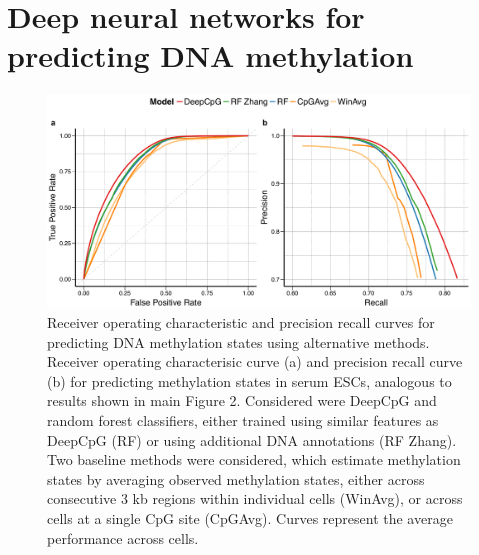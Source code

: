 
\chapter{Deep neural networks for predicting DNA methylation}

\ifpdf
    \graphicspath{{Chapter4/Figs/Raster/}{Chapter4/Figs/PDF/}{Chapter4/Figs/}}
\else
    \graphicspath{{Chapter4/Figs/Vector/}{Chapter4/Figs/}}
\fi

\begin{figure}[htbp!]
\centering
\includegraphics[width=1.0\textwidth]{curves}
\caption[Receiver operating characteristic and precision recall curves for predicting DNA methylation states using alternative methods.]{Receiver operating characteristic and precision recall curves for predicting DNA methylation states using alternative methods. Receiver operating characterisic curve (a) and precision recall curve (b) for predicting methylation states in serum ESCs, analogous to results shown in main Figure 2. Considered were DeepCpG and random forest classifiers, either trained using similar features as DeepCpG (RF) or using additional DNA annotations (RF Zhang). Two baseline methods were considered, which estimate methylation states by averaging observed methylation states, either across consecutive 3 kb regions within individual cells (WinAvg), or across cells at a single CpG site (CpGAvg). Curves represent the average performance across cells.}
\label{fig:dcpg_eval_curves}
\end{figure}

